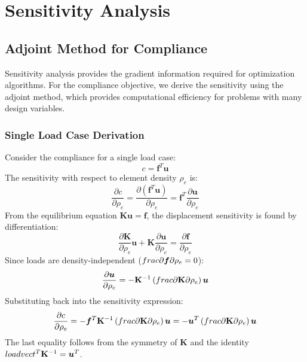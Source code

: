 \documentclass[11pt]{report}
\newcommand{\vect}[1]{\boldsymbol{#1}}
\newcommand{\matr}[1]{\mathbf{#1}}
\newcommand{\rhoe}{\rho_e}
\newcommand{\loadvect}{\vect{f}}
\newcommand{\dispvect}{\vect{u}}
\newcommand{\stiffmat}{\matr{K}}
\begin{document}
\chapter{Sensitivity Analysis}
\section{Adjoint Method for Compliance}
Sensitivity analysis provides the gradient information required for optimization algorithms. For the compliance objective, we derive the sensitivity using the adjoint method, which provides computational efficiency for problems with many design variables.
\subsection{Single Load Case Derivation}
Consider the compliance for a single load case:
\begin{equation}
c = \loadvect^T \dispvect
\end{equation}
The sensitivity with respect to element density $\rhoe$ is:
\begin{equation}
\frac{\partial c}{\partial \rhoe} = \frac{\partial(\loadvect^T \dispvect)}{\partial \rhoe} = \loadvect^T \frac{\partial \dispvect}{\partial \rhoe}
\end{equation}
From the equilibrium equation $\stiffmat \dispvect = \loadvect$, the displacement sensitivity is found by differentiation:
\begin{equation}
\frac{\partial \stiffmat}{\partial \rhoe} \dispvect + \stiffmat \frac{\partial \dispvect}{\partial \rhoe} = \frac{\partial \loadvect}{\partial \rhoe}
\end{equation}
Since loads are density-independent ($\\frac{\partial \loadvect}{\partial \rhoe} = 0$):
\begin{equation}
\frac{\partial \dispvect}{\partial \rhoe} = -\stiffmat^{-1} \left(\\frac{\partial \stiffmat}{\partial \rhoe}\right) \dispvect
\end{equation}
Substituting back into the sensitivity expression:
\begin{equation}
\frac{\partial c}{\partial \rhoe} = -\loadvect^T \stiffmat^{-1} \left(\\frac{\partial \stiffmat}{\partial \rhoe}\right) \dispvect = -\dispvect^T \left(\\frac{\partial \stiffmat}{\partial \rhoe}\right) \dispvect
\end{equation}
The last equality follows from the symmetry of $\stiffmat$ and the identity $\\loadvect^T \stiffmat^{-1} = \dispvect^T$.
\end{document}
